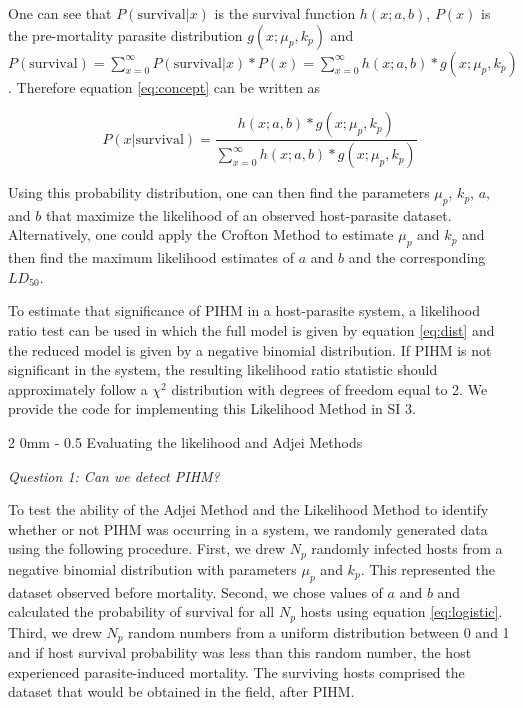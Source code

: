 \documentclass[12pt, a4paper]{article}
\makeatletter
\renewcommand{\subsection}{\@startsection
{subsection}%
{2}%
{0mm}%
{-\baselineskip}%
{0.5\baselineskip}%
{\normalfont\bf}} %
\makeatother
\begin{document}
One can see that $P(\text{survival} | x)$ is the survival function $h(x; a, b)$, $P(x)$ is the pre-mortality parasite distribution $g(x; \mu_p, k_p)$ and $P(\text{survival}) = \sum_{x=0}^{\infty} P(\text{survival} | x) * P(x) =  \sum_{x=0}^{\infty} h(x; a, b)  * g(x; \mu_p, k_p)$. Therefore equation \ref{eq:concept} can be written as

\begin{equation}
    P(x | \text{survival}) = \dfrac{h(x; a, b)  * g(x; \mu_p, k_p)}{\sum_{x=0}^{\infty} h(x; a, b)  * g(x; \mu_p, k_p)}
    \label{eq:dist}
\end{equation}

Using this probability distribution, one can then find the parameters $\mu_p$, $k_p$, $a$, and $b$ that maximize the likelihood of an observed host-parasite dataset. Alternatively, one could apply the Crofton Method to estimate $\mu_p$ and $k_p$ and then find the maximum likelihood estimates of $a$ and $b$ and the corresponding $LD_{50}$.

To estimate that significance of PIHM in a host-parasite system, a
likelihood ratio test can be used in which the full model is given by equation
\ref{eq:dist} and the reduced model is given by a negative binomial
distribution.  If PIHM is not significant in the system, the resulting likelihood
ratio statistic should approximately follow a $\chi^2$ distribution with degrees of freedom equal to 2.  We provide the code for implementing this Likelihood Method in SI 3.

\subsection{Evaluating the likelihood and Adjei Methods}

\emph{Question 1: Can we detect PIHM?}

To test the ability of the Adjei Method and the Likelihood Method to identify whether or not PIHM was occurring in a system, we randomly generated data using the following procedure.  First, we drew $N_p$ randomly infected hosts from a
negative binomial distribution with parameters $\mu_p$ and $k_p$.  This represented the dataset observed before mortality. Second, we chose values of $a$ and $b$ and calculated the probability of survival
for all $N_p$ hosts using equation \ref{eq:logistic}.  Third, we drew $N_p$ random numbers from a uniform distribution
between 0 and 1 and if host survival probability was less than this random
number, the host experienced parasite-induced mortality.  The surviving
hosts comprised the dataset that would be obtained in the field, after PIHM.
\end{document}
